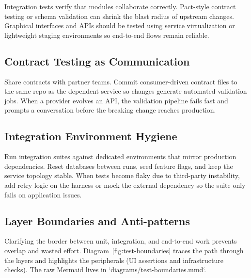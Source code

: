 Integration tests verify that modules collaborate correctly. Pact-style contract testing or schema validation can shrink the blast radius of upstream changes. Graphical interfaces and APIs should be tested using service virtualization or lightweight staging environments so end-to-end flows remain reliable.

\subsection{Contract Testing as Communication}

Share contracts with partner teams. Commit consumer-driven contract files to the same repo as the dependent service so changes generate automated validation jobs. When a provider evolves an API, the validation pipeline fails fast and prompts a conversation before the breaking change reaches production.

\subsection{Integration Environment Hygiene}

Run integration suites against dedicated environments that mirror production dependencies. Reset databases between runs, seed feature flags, and keep the service topology stable. When tests become flaky due to third-party instability, add retry logic on the harness or mock the external dependency so the suite only fails on application issues.

\subsection{Layer Boundaries and Anti-patterns}

Clarifying the border between unit, integration, and end-to-end work prevents overlap and wasted effort. Diagram~\ref{fig:test-boundaries} traces the path through the layers and highlights the peripherals (UI assertions and infrastructure checks). The raw Mermaid lives in `diagrams/test-boundaries.mmd`.



